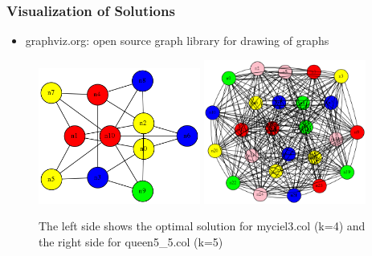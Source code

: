\documentclass{beamer}
\begin{document}
\begin{frame}
  \frametitle{Visualization of Solutions}

  \begin{itemize}
    \item graphviz.org: open source graph library for drawing of graphs
  \end{itemize}

  \begin{figure}
    \footnotesize
   \includegraphics[width=0.475\textwidth]{myciel3.png}
   \hfill
   \includegraphics[width=0.475\textwidth]{queen5_5.png}
   \caption{The left side shows the optimal solution for myciel3.col (k=4) and the right side for queen5\_5.col (k=5)}
   \label{figure1}
\end{figure}

\end{frame}
\end{document}
